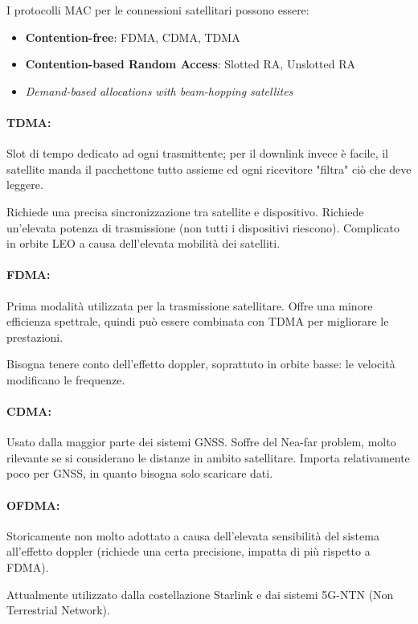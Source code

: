 I protocolli MAC per le connessioni satellitari possono essere: 
\begin{itemize}
	\item \textbf{Contention-free}: FDMA, CDMA, TDMA
	\item \textbf{Contention-based Random Access}: Slotted RA, Unslotted RA
	\item \textit{Demand-based allocations with beam-hopping satellites}
\end{itemize}

\paragraph{TDMA:} Slot di tempo dedicato ad ogni trasmittente; per il downlink invece è facile, il satellite manda il pacchettone tutto assieme ed ogni ricevitore "filtra" ciò che deve leggere.

Richiede una precisa sincronizzazione tra satellite e dispositivo. Richiede un'elevata potenza di trasmissione (non tutti i dispositivi riescono). Complicato in orbite LEO a causa dell'elevata mobilità dei satelliti.

\paragraph{FDMA:} Prima modalità utilizzata per la trasmissione satellitare. Offre una minore efficienza spettrale, quindi può essere combinata con TDMA per migliorare le prestazioni.

Bisogna tenere conto dell'effetto doppler, soprattuto in orbite basse: le velocità modificano le frequenze. 

\paragraph{CDMA:} Usato dalla maggior parte dei sistemi GNSS. Soffre del Nea-far problem, molto rilevante se si considerano le distanze in ambito satellitare. Importa relativamente poco per GNSS, in quanto bisogna solo scaricare dati.

\paragraph{OFDMA:} Storicamente non molto adottato a causa dell'elevata sensibilità del sistema all'effetto doppler (richiede una certa precisione, impatta di più rispetto a FDMA).

Attualmente utilizzato dalla costellazione Starlink e dai sistemi 5G-NTN (Non Terrestrial Network).


